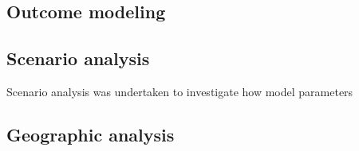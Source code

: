 \subsection{Outcome modeling}

\subsection{Scenario analysis}

Scenario analysis was undertaken to investigate how model parameters

\subsection{Geographic analysis}



